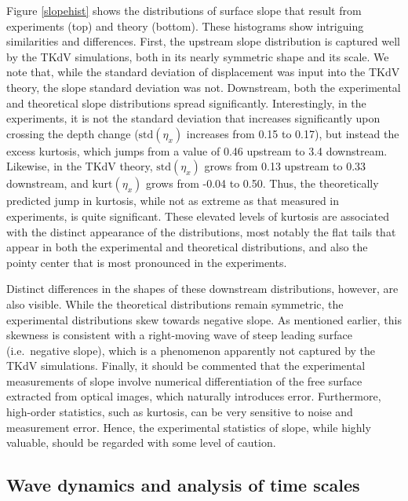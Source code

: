 \documentclass[11pt]{article}
\newcommand{\kurt}{\text{kurt}}
\newcommand{\std}{\text{std}}
\begin{document}
	Figure \ref{slopehist} shows the distributions of surface slope that result from experiments (top) and theory (bottom). These histograms show intriguing similarities and differences. First, the upstream slope distribution is captured well by the TKdV simulations, both in its nearly symmetric shape and its scale. We note that, while the standard deviation of displacement was input into the TKdV theory, the slope standard deviation was not. Downstream, both the experimental and theoretical slope distributions  spread significantly. Interestingly, in the experiments, it is not the standard deviation that increases significantly upon crossing the depth change ($\std(\eta_x)$ increases from 0.15 to 0.17), but instead the excess kurtosis, which jumps from a value of 0.46 upstream to 3.4 downstream. Likewise, in the TKdV theory, $\std(\eta_x)$ grows from 0.13 upstream to 0.33 downstream, and $\kurt(\eta_x)$ grows from -0.04 to 0.50. Thus, the theoretically predicted jump in kurtosis, while not as extreme as that measured in experiments, is quite significant. These elevated levels of kurtosis are associated with the distinct appearance of the distributions, most notably the flat tails that appear in both the experimental and theoretical distributions, and also the pointy center that is most pronounced in the experiments.
	
	Distinct differences in the shapes of these downstream distributions, however, are also visible. While the theoretical distributions remain symmetric, the experimental distributions skew towards negative slope. As mentioned earlier, this skewness is consistent with a right-moving wave of steep leading surface (i.e.~negative slope), which is a phenomenon apparently not captured by the TKdV simulations.
Finally, it should be commented that the experimental measurements of slope involve numerical differentiation of the free surface extracted from optical images, which naturally introduces error. Furthermore, high-order statistics, such as kurtosis, can be very sensitive to noise and measurement error. Hence, the experimental statistics of slope, while highly valuable, should be regarded with some level of caution. 


\subsection{Wave dynamics and analysis of time scales}
\end{document}
